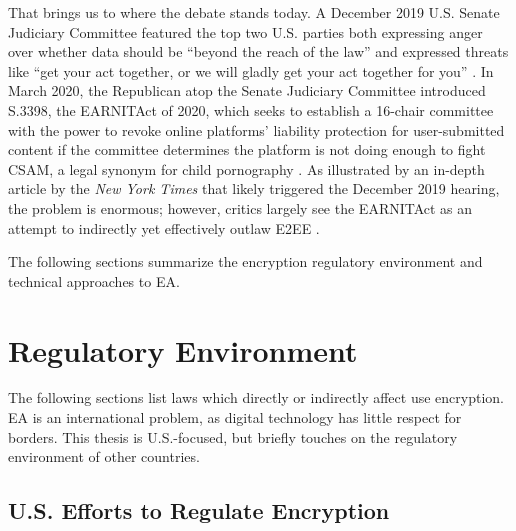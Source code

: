 That brings us to where the debate stands today. A December 2019 U.S. Senate Judiciary Committee featured the top two
U.S. parties both expressing anger over whether data should be ``beyond the reach of the law'' and expressed threats
like ``get your act together, or we will gladly get your act together for you'' \cite{geller_2019}. In March 2020, the
Republican atop the Senate Judiciary Committee introduced S.3398, the \ac{EARNITAct} of 2020, which seeks to establish a
16-chair committee with the power to revoke online platforms' liability protection for user-submitted content if the
committee determines the platform is not doing enough to fight \ac{CSAM}, a legal synonym for child pornography
\cite{graham_s3398_2020}. As illustrated by an in-depth article by the \textit{New York Times}
\cite{keller_internet_2019} that likely triggered the December 2019 hearing, the problem is enormous; however, critics
largely see the \ac{EARNITAct} as an attempt to indirectly yet effectively outlaw \ac{E2EE} \cite{newman_2020}
\cite{pfefferkorn_2020}.


The following sections summarize the encryption regulatory environment and technical approaches to \ac{EA}.



\section{Regulatory Environment}
\label{sec-reg-environment}

The following sections list laws which directly or indirectly affect use encryption. \Ac{EA} is an international
problem, as digital technology has little respect for borders. This thesis is U.S.-focused, but briefly touches on the
regulatory environment of other countries.


\subsection{U.S. Efforts to Regulate Encryption}

